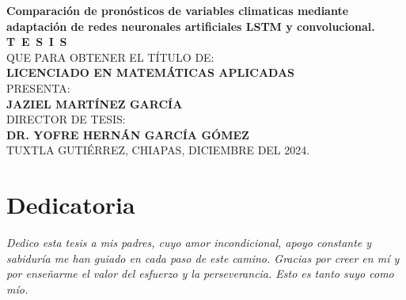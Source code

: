 \documentclass[
  us-letterpaper,
]{scrreprt}
\theoremstyle{plain}
\theoremstyle{definition}
\theoremstyle{definition}
\theoremstyle{remark}
\begin{document}
\begin{titlepage}
\begin{minipage}[t][0.79\textheight][c]{0.06\textwidth}
\begin{minipage}[b][0.08\textheight][b]{0.2\textwidth}
    \end{minipage}
\end{minipage}\hspace{1.2cm} 
\begin{minipage}[t][0.95\textheight][c]{0.9\textwidth}
	\vspace{2cm}
    \begin{center}
        {\Large\bfseries  Comparación de pronósticos de variables climaticas mediante adaptación de redes neuronales artificiales LSTM y convolucional.}\\[1.5cm]
        \textsc{\huge \textbf{T\, E\, S\, I\, S}}\\[1.5cm]
        \textsc{\large QUE PARA OBTENER EL TÍTULO DE:}\\[0.3cm]
        \textbf{\textsc{LICENCIADO EN MATEMÁTICAS APLICADAS}}\\[1.5cm]
        \textsc{\large PRESENTA:}\\[0.3cm]
        \textbf{\textsc{\large {JAZIEL MARTÍNEZ GARCÍA}}}\\[2cm]
        {\large\scshape DIRECTOR DE TESIS:\\[0.3cm]
        {\textbf{\large DR. YOFRE HERNÁN GARCÍA GÓMEZ }}}\\[2.0cm]
        \large{TUXTLA GUTIÉRREZ, CHIAPAS, DICIEMBRE DEL 2024.}
    \end{center}
    \vspace{2cm} %
  
\end{minipage} 
\end{titlepage}

\pagebreak[2]

\chapter*{Dedicatoria}
\begin{flushright}
\textit{Dedico esta tesis a mis padres, cuyo amor incondicional, apoyo constante y sabiduría me han guiado en cada paso de este camino. Gracias por creer en mí y por enseñarme el valor del esfuerzo y la perseverancia. Esto es tanto suyo como mío.}
\end{flushright}
\end{document}
